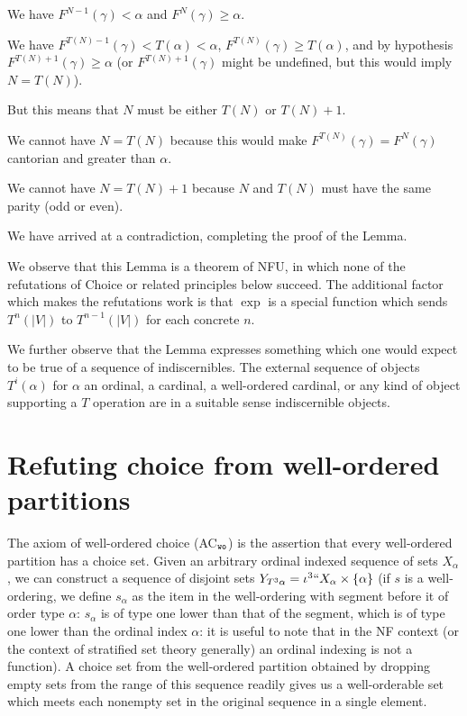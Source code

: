 \documentclass[12pt]{article}
\begin{document}
\begin{description}
We have $F^{N-1}(\gamma)<\alpha$ and $F^N(\gamma) \geq \alpha$.

We have $F^{T(N)-1}(\gamma)<T(\alpha)<\alpha$, $F^{T(N)}(\gamma) \geq T(\alpha)$, and by hypothesis $F^{T(N)+1}(\gamma) \geq \alpha$ (or $F^{T(N)+1}(\gamma)$ might be undefined, but this would imply $N=T(N)$).

But this means that $N$ must be either $T(N)$ or $T(N)+1$.

We cannot have $N=T(N)$ because this would make $F^{T(N)}(\gamma) = F^N(\gamma)$ cantorian and greater than $\alpha$.

We cannot have $N=T(N)+1$ because $N$ and $T(N)$ must have the same parity (odd or even).

We have arrived at a contradiction, completing the proof of the Lemma.



\end{description}

We observe that this Lemma is a theorem of NFU, in which none of the refutations of Choice or related principles below succeed.  The additional factor which makes the refutations work is that
$\exp$ is a special function which sends $T^n(|V|)$ to $T^{n-1}(|V|)$ for each concrete $n$.

We further observe that the Lemma expresses something which one would expect to be true of a sequence of indiscernibles.  The external sequence of objects $T^i(\alpha)$ for $\alpha$ an ordinal, a cardinal, a well-ordered cardinal, or any kind of object supporting a $T$ operation are in a suitable sense indiscernible objects.




\section{Refuting choice from well-ordered partitions}

The axiom of well-ordered choice (AC$_{\tt wo}$) is the assertion that every well-ordered partition has a choice set.
Given an arbitrary ordinal indexed sequence of sets $X_\alpha$, we can construct a sequence of disjoint
sets $Y_{T^3\alpha}=\iota^3``X_\alpha \times \{\alpha\}$ (if $s$ is a well-ordering, we define $s_{\alpha}$ as the item in the well-ordering with segment before it of order type $\alpha$: $s_\alpha$ is of type one lower than that of the segment, which is of type one lower than the ordinal index $\alpha$:  it is useful to note that in the NF context (or the context of stratified set theory generally) an ordinal indexing is not a function).
A choice set from the well-ordered partition obtained by dropping empty sets from the range of this sequence readily gives us a well-orderable set which meets each nonempty set in the original sequence in a single element.
\end{document}
